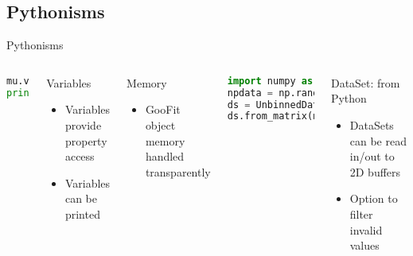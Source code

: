 \documentclass[aspectratio=169, smaller]{beamer}
\begin{document}
\subsection{Pythonisms}
\begin{frame}[fragile]{Pythonisms}
    \begin{columns}[c]
        \begin{lstlisting}[language=Python]
mu.value = 2
print(mu)
        \end{lstlisting}
        \begin{block}{Variables}
            \begin{itemize}
                \item Variables provide property access
                \item Variables can be printed
            \end{itemize}
        \end{block}
        \begin{block}{Memory}
            \begin{itemize}
                \item GooFit object memory handled transparently
            \end{itemize}
        \end{block}
        \begin{lstlisting}[language=Python]
import numpy as np 
npdata = np.random.normal(1, 2.5, (100000,1))
ds = UnbinnedDataSet(xvar)
ds.from_matrix(npdata, filter=True)
        \end{lstlisting}
        \begin{block}{DataSet: from Python}
            \begin{itemize}
                \item DataSets can be read in/out to 2D buffers
                \item Option to filter invalid values
            \end{itemize}
        \end{block}
    \end{columns}
\end{frame}
\end{document}
